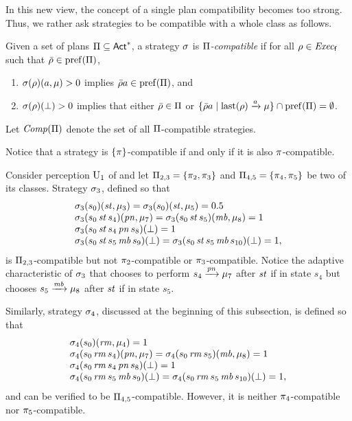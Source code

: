 In this new view, the concept of a single plan compatibility becomes
too strong.  Thus, we rather ask strategies to be compatible with a
whole class as follows.

\begin{definition}\label{def:plans:compat}
  Given a set of plans $\Pi\subseteq{\rm \sf Act}^*$, a strategy $\sigma$ is
  \emph{$\Pi$-compatible} if for all $\rho\in\mathit{Exec}_{\mathsf{f}}$ such that
  $\bar{\rho}\in\mathrm{pref}(\Pi)$,
  \begin{enumerate}
  \item\label{def:plans:compat:i}%
    $\sigma(\rho)(a,\mu)>0$ implies $\bar{\rho}a\in\mathrm{pref}(\Pi)$, and
  \item\label{def:plans:compat:ii}%
    $\sigma(\rho)(\bot)>0$ implies that either
    $\bar{\rho}\in\Pi$ or
    $\{\bar{\rho}a\mid{\mathrm{last}(\rho)\xrightarrow{a}\mu}\}\cap\mathrm{pref}(\Pi) = \emptyset$. 
  \end{enumerate}
  Let $\mathit{Comp}(\Pi)$ denote the set of all $\Pi$-compatible
  strategies.
\end{definition}
%
Notice that a strategy is $\{\pi\}$-compatible if and only if it is
also $\pi$-compatible.

\begin{example}\label{ex:running:strat-comp-adapt}
  Consider perception $\operatorname{U}_1$ of
   and let $\Pi_{2,3}=\{\pi_2,\pi_3\}$
  and $\Pi_{4,5}=\{\pi_4,\pi_5\}$ be two of its classes.
  Strategy $\sigma_3$, defined so that
  \[
  \begin{array}{l}
    \sigma_3(s_0)(\mathit{st},\mu_3)=\sigma_3(s_0)(\mathit{st},\mu_5)=0.5\\
    \sigma_3(s_0\,\mathit{st}\,s_4)(\mathit{pn},\mu_7)=\sigma_3(s_0\,\mathit{st}\,s_5)(\mathit{mb},\mu_8)=1\\
    \sigma_3(s_0\,\mathit{st}\,s_4\,\mathit{pn}\,s_8)(\bot)=1\\
    \sigma_3(s_0\,\mathit{st}\,s_5\,\mathit{mb}\,s_9)(\bot)=
    \sigma_3(s_0\,\mathit{st}\,s_5\,\mathit{mb}\,s_{10})(\bot)=1,
  \end{array}
  \]
  is $\Pi_{2,3}$-compatible but not
  $\pi_2$-compatible or $\pi_3$-compatible.
  Notice the adaptive characteristic of $\sigma_3$ that chooses to
  perform $s_4\xrightarrow{\mathit{pn}}\mu_7$ after $\mathit{st}$ if in state $s_4$
  but chooses $s_5\xrightarrow{\mathit{mb}}\mu_8$ after $\mathit{st}$ if in
  state $s_5$.

  Similarly, strategy $\sigma_4$, discussed at the beginning of this
  subsection, is defined so that
  \[
  \begin{array}{l}
    \sigma_4(s_0)(\mathit{rm},\mu_4)=1\\
    \sigma_4(s_0\,\mathit{rm}\,s_4)(\mathit{pn},\mu_7)=\sigma_4(s_0\,\mathit{rm}\,s_5)(\mathit{mb},\mu_8)=1\\
    \sigma_4(s_0\,\mathit{rm}\,s_4\,\mathit{pn}\,s_8)(\bot)=1\\
    \sigma_4(s_0\,\mathit{rm}\,s_5\,\mathit{mb}\,s_9)(\bot)=
    \sigma_4(s_0\,\mathit{rm}\,s_5\,\mathit{mb}\,s_{10})(\bot)=1,
  \end{array}
  \]
  and can be verified to be $\Pi_{4,5}$-compatible. However, it is
  neither $\pi_4$-compatible nor $\pi_5$-compatible.
\end{example}

